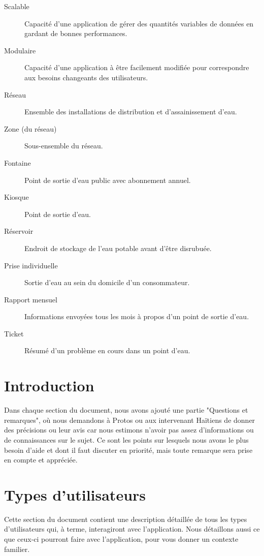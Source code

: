 \documentclass[a4paper, 11pt]{article}
\begin{document}
\begin{description}
    \item[Scalable] Capacité d'une application de gérer des quantités variables de données en gardant de bonnes performances.
    \item[Modulaire] Capacité d'une application à être facilement modifiée pour correspondre aux besoins changeants des utilisateurs.
    \item[Réseau] Ensemble des installations de distribution et d'assainissement d'eau.
    \item[Zone (du réseau)] Sous-ensemble du réseau.
    \item[Fontaine] Point de sortie d'eau public avec abonnement annuel.
    \item[Kiosque] Point de sortie d'eau. %
    \item[Réservoir] Endroit de stockage de l'eau potable avant d'être disrubuée.
    \item[Prise individuelle] Sortie d'eau au sein du domicile d'un consommateur.
    \item[Rapport mensuel] Informations envoyées tous les mois à propos d'un point de sortie d'eau.
    \item[Ticket] Résumé d'un problème en cours dans un point d'eau.
  \end{description}
\section{Introduction}
Dans chaque section du document, nous avons ajouté une partie "Questions et remarques", où nous demandons à Protos ou aux intervenant Haïtiens de donner des précisions ou leur avis car nous estimons n'avoir pas assez d'informations ou de connaissances sur le sujet. Ce sont les points sur lesquels nous avons le plus besoin d'aide et dont il faut discuter en priorité, mais toute remarque sera prise en compte et appréciée.
\section{Types d'utilisateurs}
\label{users}
Cette section du document contient une description détaillée de tous les types d'utilisateurs qui, à terme, interagiront avec l'application. Nous détaillons aussi ce que ceux-ci pourront faire avec l'application, pour vous donner un contexte familier.
\end{document}
